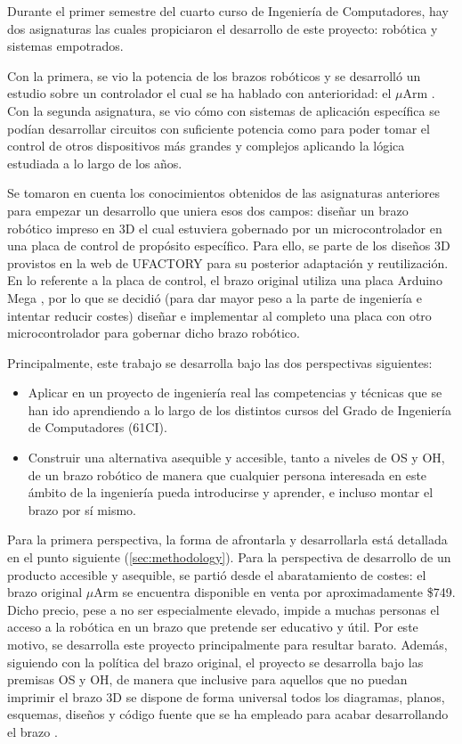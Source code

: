 Durante el primer semestre del cuarto curso de Ingeniería de Computadores,
hay dos asignaturas las cuales propiciaron el desarrollo de este proyecto: robótica
y sistemas empotrados.

Con la primera, se vio la potencia de los brazos robóticos y se desarrolló un estudio
sobre un controlador el cual se ha hablado con anterioridad: el $\mu$Arm \cite{UPMRoboticsUarm2019b}.
Con la segunda asignatura, se vio cómo con sistemas de aplicación específica se podían
desarrollar circuitos con suficiente potencia como para poder tomar el control de otros
dispositivos más grandes y complejos aplicando la lógica estudiada a lo largo de los
años.

Se tomaron en cuenta los conocimientos obtenidos de las asignaturas anteriores
para empezar un desarrollo que uniera esos dos campos: diseñar un brazo robótico
impreso en 3D el cual estuviera gobernado por un microcontrolador en una placa de
control de propósito específico. Para ello, se parte de los diseños 3D provistos
en la web de UFACTORY \cite{UFACTORYXArmTextbackslashtextbaruArm} para su posterior
adaptación y reutilización. En lo referente a la placa de control, el brazo original
utiliza una placa Arduino Mega \cite{ArduinoMega2560}, por lo que se decidió (para dar
mayor peso a la parte de ingeniería e intentar reducir costes) diseñar e implementar al completo una placa con
otro microcontrolador para gobernar dicho brazo robótico.

Principalmente, este trabajo se desarrolla bajo las dos perspectivas siguientes:
\begin{itemize}
    \item Aplicar en un proyecto de ingeniería real las competencias y técnicas que 
    se han ido aprendiendo a lo largo de los distintos cursos del Grado de Ingeniería
    de Computadores (61CI).
    \item Construir una alternativa asequible y accesible, tanto a niveles de \ac{OS} y
    \ac{OH}, de un brazo robótico de manera que cualquier persona interesada en este
    ámbito de la ingeniería pueda introducirse y aprender, e incluso montar el brazo
    por sí mismo.
\end{itemize}

Para la primera perspectiva, la forma de afrontarla y desarrollarla está detallada en el
punto siguiente (\ref{sec:methodology}). Para la perspectiva de desarrollo de un
producto accesible y asequible, se partió desde el abaratamiento de costes: el brazo
original $\mu$Arm se encuentra disponible en venta por aproximadamente \$749. Dicho precio,
pese a no ser especialmente elevado, impide a muchas personas el acceso a la robótica
en un brazo que pretende ser educativo y útil. Por este motivo, se desarrolla este proyecto
principalmente para resultar barato. Además, siguiendo con la política del brazo
original, el proyecto se desarrolla bajo las premisas \ac{OS} y \ac{OH}, de manera que
inclusive para aquellos que no puedan imprimir el brazo 3D se dispone de forma universal
todos los diagramas, planos, esquemas, diseños y código fuente que se ha empleado para
acabar desarrollando el brazo \pArm{}.